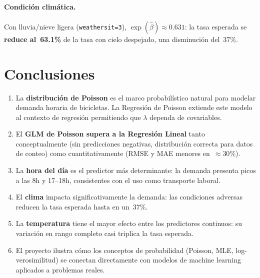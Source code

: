 \documentclass[12pt, a4paper]{article}
\begin{document}
	\paragraph{Condici\'on clim\'atica.}
	Con lluvia/nieve ligera (\texttt{weathersit=3}), $\exp(\hat{\beta}) \approx 0.631$:
	la tasa esperada se \textbf{reduce al~63.1\%} de la tasa con cielo despejado,
	una disminuci\'on del~37\%.
	
	\section{Conclusiones}
	
	\begin{enumerate}
		\item La \textbf{distribuci\'on de Poisson} es el marco probabil\'istico natural
		para modelar demanda horaria de bicicletas. La Regresi\'on de Poisson extiende
		este modelo al contexto de regresi\'on permitiendo que $\lambda$ dependa de
		covariables.
		
		\item El \textbf{GLM de Poisson supera a la Regresi\'on Lineal} tanto
		conceptualmente (sin predicciones negativas, distribuci\'on correcta para datos
		de conteo) como cuantitativamente (RMSE y MAE menores en~$\approx 30\%$).
		
		\item La \textbf{hora del d\'ia} es el predictor m\'as determinante: la demanda
		presenta picos a las 8h y 17--18h, consistentes con el uso como transporte
		laboral.
		
		\item El \textbf{clima} impacta significativamente la demanda: las condiciones
		adversas reducen la tasa esperada hasta en un~37\%.
		
		\item La \textbf{temperatura} tiene el mayor efecto entre los predictores
		continuos: su variaci\'on en rango completo casi triplica la tasa esperada.
		
		\item El proyecto ilustra c\'omo los conceptos de probabilidad (Poisson, MLE,
		log-verosimilitud) se conectan directamente con modelos de machine learning
		aplicados a problemas reales.
	\end{enumerate}
	
\end{document}
